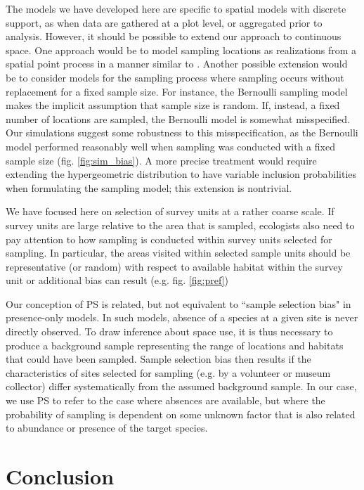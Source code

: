 \documentclass[times,mee,doublespace,]{besauth2}
\begin{document}
The models we have developed here are specific to spatial models with discrete support, as when data are gathered at a plot level, or aggregated prior to analysis.  However, it should be possible to extend our approach to continuous space.  One approach would be to model sampling locations as realizations from a spatial point process in a manner similar to \citet{WartonShepherd2010}. Another possible extension would be to consider models for the sampling process where sampling occurs without replacement for a fixed sample size.  For instance, the Bernoulli sampling model makes the implicit assumption that sample size is random.  If, instead, a fixed number of locations are sampled, the Bernoulli model is somewhat misspecified.  Our simulations suggest some robustness to this misspecification, as the Bernoulli model performed reasonably well when sampling was conducted with a fixed sample size (fig. \ref{fig:sim_bias}).  A more precise treatment would require extending the hypergeometric distribution to have variable inclusion probabilities when formulating the sampling model; this extension is nontrivial.

We have focused here on selection of survey units at a rather coarse scale.  If survey units are large relative to the area that is sampled, ecologists also need to pay attention to how sampling is conducted within survey units selected for sampling.  In particular, the areas visited within selected sample units should be representative (or random) with respect to available habitat within the survey unit or additional bias can result (e.g. fig. \ref{fig:pref})

Our conception of PS is related, but not equivalent to ``sample selection bias" \citep[e.g.][]{PhillipsEtAl2009} in presence-only models.  In such models, absence of a species at a given site is never directly observed.  To draw inference about space use, it is thus necessary to produce a background sample representing the range of locations and habitats that could have been sampled. Sample selection bias then results if the characteristics of sites selected for sampling (e.g. by a volunteer or museum collector) differ systematically from the assumed background sample.  In our case, we use PS to refer to the case where absences are available, but where the probability of sampling is dependent on some unknown factor that is also related to abundance or presence of the target species.

\section{Conclusion}
\end{document}
